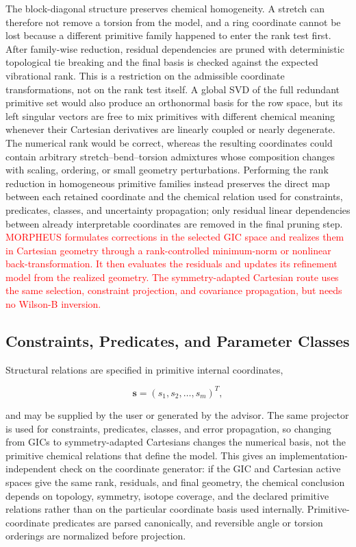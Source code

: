 \documentclass[aip,jcp,reprint,longbibliography,floatfix]{revtex4-2}
\newcommand{\rev}[1]{\textcolor{red}{#1}}
\begin{document}
The block-diagonal structure preserves chemical homogeneity. A stretch can
therefore not remove a torsion from the model, and a ring coordinate cannot be
lost because a different primitive family happened to enter the rank test
first. After family-wise reduction, residual dependencies are pruned with
deterministic topological tie breaking and the final basis is checked against
the expected vibrational rank.
This is a restriction on the admissible coordinate transformations, not on the
rank test itself. A global SVD of the full redundant primitive set would also
produce an orthonormal basis for the row space, but its left singular vectors
are free to mix primitives with different chemical meaning whenever their
Cartesian derivatives are linearly coupled or nearly degenerate. The numerical
rank would be correct, whereas the resulting coordinates could contain
arbitrary stretch--bend--torsion admixtures whose composition changes with
scaling, ordering, or small geometry perturbations. Performing the rank
reduction in homogeneous primitive families instead preserves the direct map
between each retained coordinate and the chemical relation used for
constraints, predicates, classes, and uncertainty propagation; only residual
linear dependencies between already interpretable coordinates are removed in
the final pruning step.
\rev{MORPHEUS formulates corrections in the selected GIC space and realizes them in
Cartesian geometry through a rank-controlled minimum-norm or nonlinear
back-transformation. It then evaluates the residuals and updates its
refinement model from the realized geometry. The symmetry-adapted Cartesian route uses
the same selection, constraint projection, and covariance propagation, but
needs no Wilson-B inversion.}


\subsection{Constraints, Predicates, and Parameter Classes}

Structural relations are specified in primitive internal coordinates,

\begin{equation}
\mathbf{s} = (s_1,s_2,\ldots,s_m)^T ,
\end{equation}

and may be supplied by the user or generated by the advisor. The same
projector is used for constraints, predicates, classes, and error propagation,
so changing from GICs to symmetry-adapted Cartesians changes the numerical
basis, not the primitive chemical relations that define the model.
This gives an implementation-independent check on the coordinate generator:
if the GIC and Cartesian active spaces give the same rank, residuals, and final
geometry, the chemical conclusion depends on topology, symmetry, isotope
coverage, and the declared primitive relations rather than on the particular
coordinate basis used internally.
Primitive-coordinate predicates are parsed canonically, and reversible
angle or torsion orderings are normalized before projection.
\end{document}
